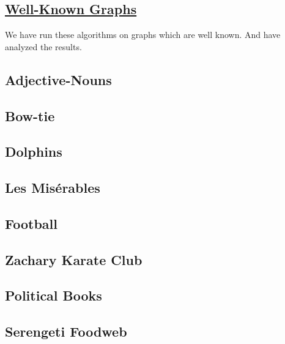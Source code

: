 \documentclass[twocolumn,twoside]{IEEEtran}
\begin{document}
\subsection*{\underline{Well-Known Graphs}}

\newcommand{\inputsamepage}[1] {
    \begin{minipage}{\linewidth}
        
    \end{minipage}
}

We have run these algorithms on graphs which are well known. And have analyzed the
results.

\subsection*{Adjective-Nouns}
\inputsamepage{include/adjnoun.tex}

\subsection*{Bow-tie}
\inputsamepage{include/bowtie.tex}

\subsection*{Dolphins}
\inputsamepage{include/dolphins.tex}

\subsection*{Les Mis\'{e}rables}
\inputsamepage{include/lesmis.tex}

\subsection*{Football}
\inputsamepage{include/football.tex}

\subsection*{Zachary Karate Club}
\inputsamepage{include/karate.tex}

\subsection*{Political Books}
\inputsamepage{include/polbooks.tex}

\subsection*{Serengeti Foodweb}
\inputsamepage{include/serengeti-foodweb.tex}
\end{document}
